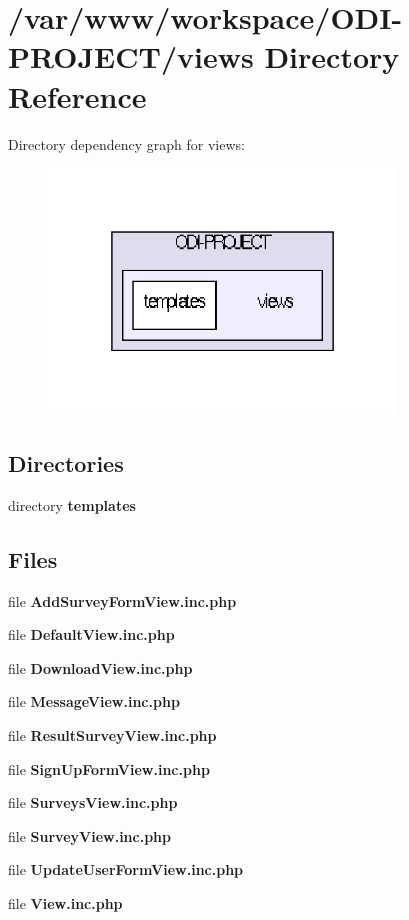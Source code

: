 \section{/var/www/workspace/\+O\+D\+I-\/\+P\+R\+O\+J\+E\+C\+T/views Directory Reference}
\label{dir_ef586ad54491d4e8f33fbbbc64d1e2be}
Directory dependency graph for views\+:\nopagebreak
\begin{figure}[H]
\begin{center}
\leavevmode
\includegraphics[width=262pt]{dir_ef586ad54491d4e8f33fbbbc64d1e2be_dep}
\end{center}
\end{figure}
\subsection*{Directories}
\begin{DoxyCompactItemize}
\item 
directory {\bf templates}
\end{DoxyCompactItemize}
\subsection*{Files}
\begin{DoxyCompactItemize}
\item 
file {\bfseries Add\+Survey\+Form\+View.\+inc.\+php}
\item 
file {\bfseries Default\+View.\+inc.\+php}
\item 
file {\bfseries Download\+View.\+inc.\+php}
\item 
file {\bfseries Message\+View.\+inc.\+php}
\item 
file {\bfseries Result\+Survey\+View.\+inc.\+php}
\item 
file {\bfseries Sign\+Up\+Form\+View.\+inc.\+php}
\item 
file {\bfseries Surveys\+View.\+inc.\+php}
\item 
file {\bfseries Survey\+View.\+inc.\+php}
\item 
file {\bfseries Update\+User\+Form\+View.\+inc.\+php}
\item 
file {\bfseries View.\+inc.\+php}
\end{DoxyCompactItemize}
